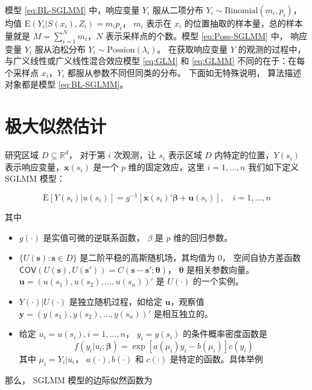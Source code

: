 \documentclass[12pt,a4paper,UTF8,twoside]{book}
\providecommand{\tightlist}{%
  \setlength{\itemsep}{0pt}\setlength{\parskip}{0pt}}
\theoremstyle{definition}
\theoremstyle{definition}
\theoremstyle{definition}
\theoremstyle{remark}
\begin{document}
\noindent 模型 \eqref{eq:BL-SGLMM} 中，响应变量 \(Y_i\) 服从二项分布
\(Y_i \sim \mathrm{Binomial}(m_i,p_i)\)， 均值
\(\mathrm{E}(Y_i|S(x_i),Z_i)=m_{i}p_{i}\)， \(m_i\) 表示在 \(x_i\)
的位置抽取的样本量，总的样本量就是 \(M=\sum_{i=1}^{N}m_i\)，\(N\)
表示采样点的个数。模型 \eqref{eq:Poss-SGLMM} 中， 响应变量 \(Y_i\)
服从泊松分布 \(Y_i \sim \mathrm{Possion}(\lambda_i)\)。 在获取响应变量
\(Y\) 的观测的过程中，与广义线性或广义线性混合效应模型 \eqref{eq:GLM} 和
\eqref{eq:GLMM} 不同的在于：在每个采样点 \(x_i\)，\(Y_i\)
都服从参数不同但同类的分布。 下面如无特殊说明， 算法描述对象都是模型
\eqref{eq:BL-SGLMM}。

\hypertarget{mle}{%
\section{极大似然估计}\label{mle}}

研究区域 \(D \subseteq \mathbb{R}^d\)， 对于第 \(i\) 次观测，让 \(s_i\)
表示区域 \(D\) 内特定的位置，\(Y(s_i)\)
表示响应变量，\(\mathbf{x}(s_i)\) 是一个 \(p\) 维的固定效应，这里
\(i = 1, \ldots, n\) 我们如下定义 SGLMM 模型：

\[
\mathrm{E}[Y(s_i)|u(s_i)] = g^{-1}[\mathbf{x}(s_i)'\boldsymbol{\beta} + \mathbf{u}(s_i)], \quad i = 1,\ldots,n
\]

\noindent 其中

\begin{itemize}
\tightlist
\item
  \(g(\cdot)\) 是实值可微的逆联系函数， \(\beta\) 是 \(p\)
  维的回归参数。
\item
  \(\{U(\mathbf{s}): \mathbf{s} \in D\}\)
  是二阶平稳的高斯随机场，其均值为 0， 空间自协方差函数
  \(\mathsf{COV}(U(\mathbf{s}),U(\mathbf{s}')) = C(\mathbf{s} - \mathbf{s}'; \boldsymbol{\theta})\)，
  \(\boldsymbol{\theta}\) 是相关参数向量。
  \(\mathbf{u} = (u(s_1),u(s_2),\ldots,u(s_n))'\) 是 \(U(\cdot)\)
  的一个实例。
\item
  \(Y(\cdot)|U(\cdot)\) 是独立随机过程，如给定 \(\mathbf{u}\)，观察值
  \(\mathbf{y} = (y(s_1),y(s_2),\ldots,y(s_n))'\) 是相互独立的。
\item
  给定 \(u_i = u(s_i), i = 1, \ldots, n\)， \(y_i = y(s_i)\)
  的条件概率密度函数是
  \[f(y_i|u_i;\boldsymbol{\beta}) = \exp[a(\mu_i)y_i - b(\mu_i)]c(y_i)\]
  其中 \(\mu_i = Y_i|u_i\)， \(a(\cdot),b(\cdot)\) 和 \(c(\cdot)\)
  是特定的函数。具体举例 \citep{McCullagh1989}
\end{itemize}

\noindent 那么， SGLMM 模型的边际似然函数为
\end{document}
